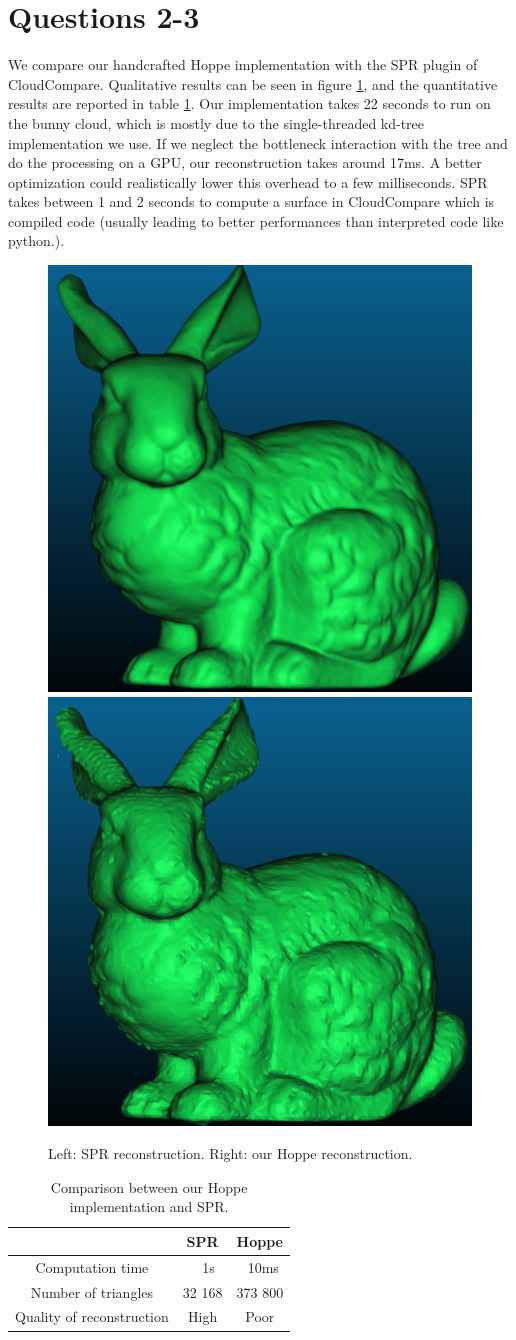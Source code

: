 \documentclass[a4paper]{article}
\begin{document}
\section*{Questions 2-3}
We compare our handcrafted Hoppe implementation with the SPR plugin of CloudCompare.
Qualitative results can be seen in figure \ref{fig:hoppe_vs_spr}, and the quantitative results are 
reported in table \ref{tab:HoppeTable}. Our implementation takes 22 seconds to run
on the bunny cloud, which is mostly due to the single-threaded kd-tree implementation we use.
If we neglect the bottleneck interaction with the tree and do the processing on a GPU,
our reconstruction takes around 17ms. A better optimization could realistically lower this
overhead to a few milliseconds.
SPR takes between 1 and 2 seconds to compute a surface in CloudCompare
 which is compiled code (usually leading to better performances than interpreted code like python.).

\begin{figure}[ht]
  \centering
  \includegraphics[width=0.3\linewidth]{figures/SPR.png}
  \includegraphics[width=0.3\linewidth]{figures/Hoppe.png}
  \caption{Left: SPR reconstruction. Right: our Hoppe reconstruction.}
  \label{fig:hoppe_vs_spr}
\end{figure}

\begin{table}
    \centering
    \begin{tabular}{|c|c|c|}
      \hline
         & SPR & Hoppe \\
      \hline
      Computation time & ~ 1s & ~10ms \\
      Number of triangles & 32 168 & 373 800 \\
      Quality of reconstruction & High & Poor \\
      \hline
    \end{tabular}
    \caption{Comparison between our Hoppe implementation and SPR.}
    \label{tab:HoppeTable}
  \end{table}
\end{document}
